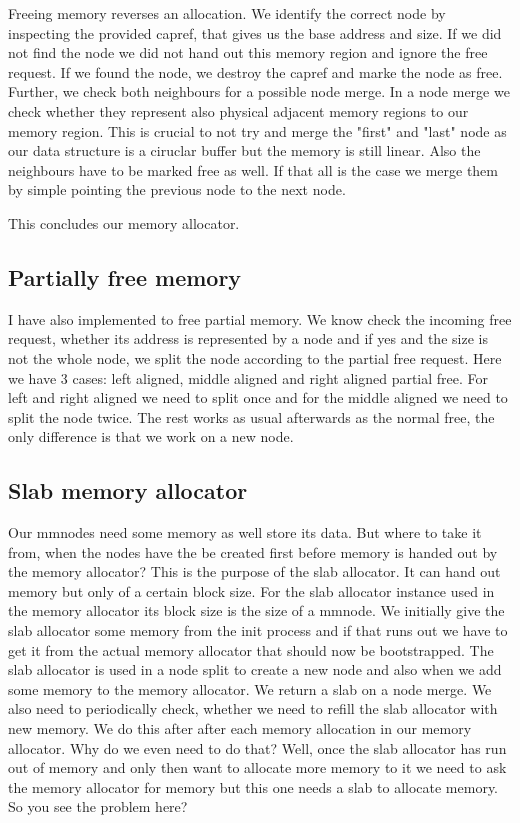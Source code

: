 Freeing memory reverses an allocation. We identify the correct node by
inspecting the provided capref, that gives us the base address and size.  If we
did not find the node we did not hand out this memory region and ignore the free
request.  If we found the node, we destroy the capref and marke the node as
free. Further, we check both neighbours for a possible node merge. In a node
merge we check whether they represent also physical adjacent memory regions to
our memory region. This is crucial to not try and merge the "first" and "last"
node as our data structure is a ciruclar buffer but the memory is still linear.
Also the neighbours have to be marked free as well. If that all is the case we
merge them by simple pointing the previous node to the next node.

This concludes our memory allocator.

\subsection{Partially free memory}

I have also implemented to free partial memory. We know check the incoming free
request, whether its address is represented by a node and if yes and the size is
not the whole node, we split the node according to the partial free request.
Here we have 3 cases: left aligned, middle aligned and right aligned partial
free. For left and right aligned we need to split once and for the middle
aligned we need to split the node twice. The rest works as usual afterwards as
the normal free, the only difference is that we work on a new node.

\subsection{Slab memory allocator}

Our mmnodes need some memory as well store its data. But where to take it from,
when the nodes have the be created first before memory is handed out by the
memory allocator?  This is the purpose of the slab allocator. It can hand out
memory but only of a certain block size. For the slab allocator instance used in
the memory allocator its block size is the size of a mmnode. We initially give
the slab allocator some memory from the init process and if that runs out we
have to get it from the actual memory allocator that should now be bootstrapped.
The slab allocator is used in a node split to create a new node and also when we
add some memory to the memory allocator. We return a slab on a node merge. We
also need to periodically check, whether we need to refill the slab allocator
with new memory. We do this after after each memory allocation in our memory
allocator.  Why do we even need to do that?  Well, once the slab allocator has
run out of memory and only then want to allocate more memory to it we need to
ask the memory allocator for memory but this one needs a slab to allocate
memory. So you see the problem here?

